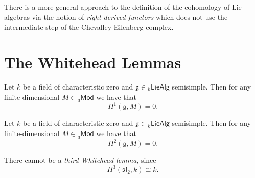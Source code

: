 \begin{remark}
	There is a more general approach to the definition of the cohomology of Lie algebras via the notion of \emph{right derived functors} which does not use the intermediate step of the Chevalley-Eilenberg complex. 
\end{remark}

\section*{The Whitehead Lemmas}


\begin{theorem}
	\label{thm:Wfl}
	Let $k$ be a field of characteristic zero and $\mathfrak{g} \in {_{k}}\mathsf{LieAlg}$ semisimple. Then for any finite-dimensional $M \in {_{\mathfrak{g}}}\mathsf{Mod}$ we have that
	\begin{equation*}
		H^1(\mathfrak{g},M) = 0.
	\end{equation*}
\end{theorem}

\begin{theorem}
	\label{thm:Wfl}
	Let $k$ be a field of characteristic zero and $\mathfrak{g} \in {_{k}}\mathsf{LieAlg}$ semisimple. Then for any finite-dimensional $M \in {_{\mathfrak{g}}}\mathsf{Mod}$ we have that
	\begin{equation*}
		H^2(\mathfrak{g},M) = 0.
	\end{equation*}
\end{theorem}

\begin{remark}
	There cannot be a \emph{third Whitehead lemma}, since
	\begin{equation*}
		H^3(\mathfrak{sl}_2,k) \cong k.
	\end{equation*}
\end{remark}

\printbibliography

